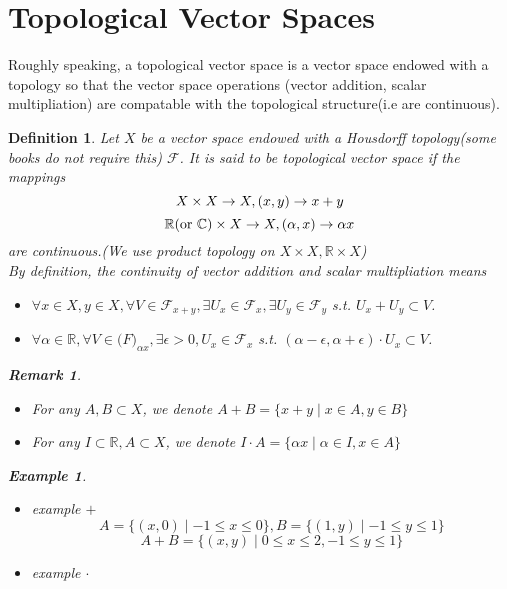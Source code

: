 \documentclass{article}
\newtheorem*{definition}{Definition}
\newtheorem*{remark}{Remark}
\newtheorem*{example}{Example}
\begin{document}
\section*{Topological Vector Spaces}
Roughly speaking, a topological vector space is a vector space endowed with a topology so that the vector space operations
(vector addition, scalar multipliation) are compatable with the topological structure(i.e are continuous).
\begin{definition}
    Let $X$ be a vector space endowed with a Housdorff topology(some books do not require this) $\mathcal{F}$.
    It is said to be topological vector space if the mappings
    \[
        X \times X \rightarrow X, (x, y) \rightarrow x + y \\
    \]
    \[
        \mathbb{R}(\textnormal{or } \mathbb{C}) \times X \rightarrow X, (\alpha, x) \rightarrow \alpha x
    \]
    are continuous.(We use product topology on $X \times X, \mathbb{R} \times X$) \\
    By definition, the continuity of vector addition and scalar multipliation means
    \begin{itemize}
        \item $\forall x \in X, y \in X, \forall V \in \mathcal{F}_{x + y}, \exists U_x \in \mathcal{F}_x, \exists U_y \in \mathcal{F}_y$
        s.t. $U_x + U_y \subset V$.
        \item $\forall \alpha \in \mathbb{R}, \forall V \in \mathbb(F)_{\alpha x}, \exists \epsilon > 0, U_x \in \mathcal{F}_x$
        s.t. $(\alpha - \epsilon, \alpha + \epsilon) \cdot U_x \subset V$.
    \end{itemize}
    \begin{remark} \hfill
        \begin{itemize}
            \item For any $A, B \subset X$, we denote $A + B = \{ x + y \mid x \in A, y \in B\}$
            \item For any $I \subset \mathbb{R}, A \subset X$, we denote $I \cdot A = \{ \alpha x \mid \alpha \in I, x \in A\}$
        \end{itemize}
        \begin{example} \hfill
            \begin{itemize}
                \item example $+$
                \[ A = \{(x, 0) \mid -1 \le x \le 0\}, B = \{(1, y) \mid -1 \le y \le 1\} \]
                \[A + B = \{(x, y) \mid 0 \le x \le 2, -1 \le y \le 1\}\]
                \item example $\cdot$

\end{itemize}
\end{example}
\end{remark}
\end{definition}
\end{document}
